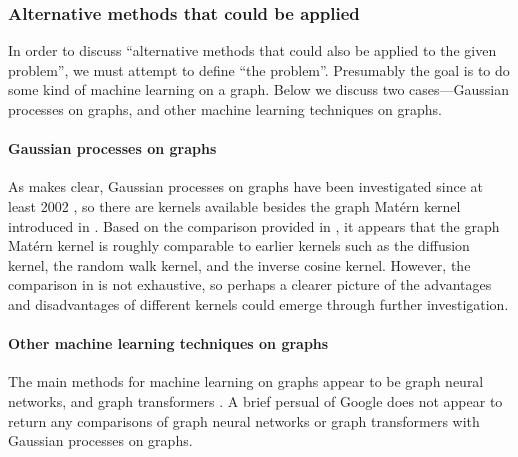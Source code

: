 \subsubsection{Alternative methods that could be applied}


In order to discuss ``alternative methods that could also be applied to the given problem'', we must attempt to define ``the problem''. Presumably the goal is to do some kind of machine learning on a graph. Below we discuss two cases---Gaussian processes on graphs, and other machine learning techniques on graphs.

\paragraph{Gaussian processes on graphs} As \cite{pmlr-v130-borovitskiy21a} makes clear, Gaussian processes on graphs have been investigated since at least 2002 \cite{kondor2002diffusion}, so there are kernels available besides the graph Mat\'{e}rn kernel introduced in \cite{pmlr-v130-borovitskiy21a}. Based on the comparison provided in \cite{pmlr-v130-borovitskiy21a}, it appears that the graph Mat\'{e}rn kernel is roughly comparable to earlier kernels such as the diffusion kernel, the random walk kernel, and the inverse cosine kernel. However, the comparison in \cite{pmlr-v130-borovitskiy21a} is not exhaustive, so perhaps a clearer picture of the advantages and disadvantages of different kernels could emerge through further investigation.

\paragraph{Other machine learning techniques on graphs} The main methods for machine learning on graphs appear to be graph neural networks, and graph transformers \cite{huggraph, stangraph}. A brief persual of Google does not appear to return any comparisons of graph neural networks or graph transformers with Gaussian processes on graphs.


